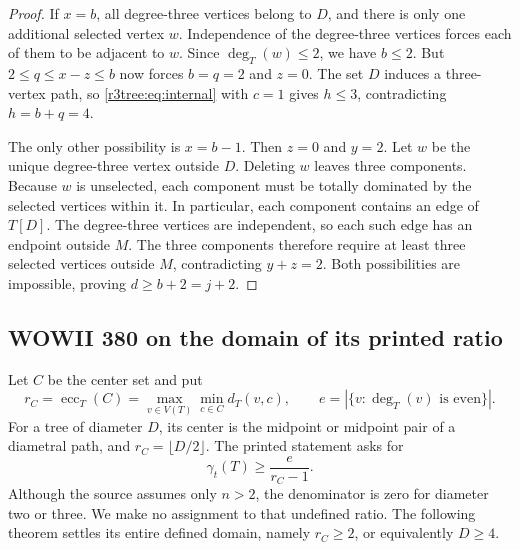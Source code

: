 \documentclass[11pt,a4paper]{article}
\theoremstyle{remark}
\begin{document}
\begin{proof}
If $x=b$, all degree-three vertices belong to $D$, and there is
only one additional selected vertex $w$.
Independence of the degree-three vertices forces each of them to
be adjacent to $w$.  Since $\deg_T(w)\le2$, we have $b\le2$.
But $2\le q\le x-z\le b$ now forces $b=q=2$ and $z=0$.
The set $D$ induces a three-vertex path, so
\eqref{r3tree:eq:internal} with $c=1$ gives $h\le3$,
contradicting $h=b+q=4$.

The only other possibility is $x=b-1$.  Then $z=0$ and $y=2$.
Let $w$ be the unique degree-three vertex outside $D$.
Deleting $w$ leaves three components.  Because $w$ is unselected,
each component must be totally dominated by the selected vertices
within it.  In particular, each component contains an edge of
$T[D]$.  The degree-three vertices are independent, so each such
edge has an endpoint outside $M$.  The three components therefore
require at least three selected vertices outside $M$, contradicting
$y+z=2$.
Both possibilities are impossible, proving $d\ge b+2=j+2$.
\end{proof}


\subsection{WOWII 380 on the domain of its printed ratio}
\label{r3tree:sec:380}

Let $C$ be the center set and put
\[
r_C=\operatorname{ecc}_T(C)
 =\max_{v\in V(T)}\min_{c\in C}d_T(v,c),
\qquad e=|\{v:\deg_T(v)\text{ is even}\}|.
\]
For a tree of diameter $D$, its center is the midpoint or midpoint
pair of a diametral path, and $r_C=\lfloor D/2\rfloor$.
The printed statement asks for
\begin{equation}\label{r3tree:eq:380}
\gamma_t(T)\ge\frac{e}{r_C-1}.
\end{equation}
Although the source assumes only $n>2$, the denominator is zero
for diameter two or three.  We make no assignment to that undefined
ratio.  The following theorem settles its entire defined domain,
namely $r_C\ge2$, or equivalently $D\ge4$.
\end{document}
